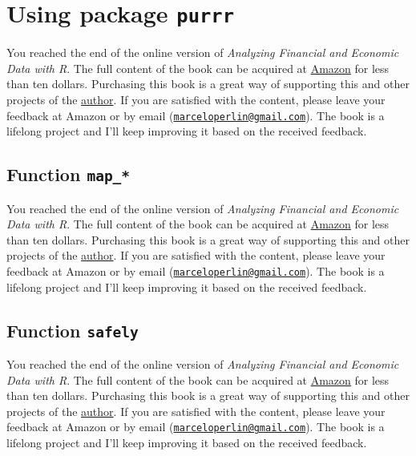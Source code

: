 \documentclass[
  12pt,
]{book}
\newenvironment{pleasebuyit}
{\begin{noteblock}
		
	} {\end{noteblock}}
\begin{document}
\hypertarget{using-package-purrr}{%
\section{\texorpdfstring{Using package \texttt{purrr}}{Using package purrr}}\label{using-package-purrr}}

\begin{pleasebuyit}
You reached the end of the online version of \emph{Analyzing Financial
and Economic Data with R}. The full content of the book can be acquired
at \href{https://www.amazon.com/dp/B084LSNXMN}{Amazon} for less than ten
dollars. Purchasing this book is a great way of supporting this and
other projects of the \href{https://www.msperlin.com/blog/}{author}. If
you are satisfied with the content, please leave your feedback at Amazon
or by email
(\href{mailto:marceloperlin@gmail.com}{\nolinkurl{marceloperlin@gmail.com}}).
The book is a lifelong project and I'll keep improving it based on the
received feedback.
\end{pleasebuyit}

\hypertarget{function-map_}{%
\subsection{\texorpdfstring{Function \texttt{map\_*}}{Function map\_*}}\label{function-map_}}

\begin{pleasebuyit}
You reached the end of the online version of \emph{Analyzing Financial
and Economic Data with R}. The full content of the book can be acquired
at \href{https://www.amazon.com/dp/B084LSNXMN}{Amazon} for less than ten
dollars. Purchasing this book is a great way of supporting this and
other projects of the \href{https://www.msperlin.com/blog/}{author}. If
you are satisfied with the content, please leave your feedback at Amazon
or by email
(\href{mailto:marceloperlin@gmail.com}{\nolinkurl{marceloperlin@gmail.com}}).
The book is a lifelong project and I'll keep improving it based on the
received feedback.
\end{pleasebuyit}

\hypertarget{function-safely}{%
\subsection{\texorpdfstring{Function \texttt{safely}}{Function safely}}\label{function-safely}}

\begin{pleasebuyit}
You reached the end of the online version of \emph{Analyzing Financial
and Economic Data with R}. The full content of the book can be acquired
at \href{https://www.amazon.com/dp/B084LSNXMN}{Amazon} for less than ten
dollars. Purchasing this book is a great way of supporting this and
other projects of the \href{https://www.msperlin.com/blog/}{author}. If
you are satisfied with the content, please leave your feedback at Amazon
or by email
(\href{mailto:marceloperlin@gmail.com}{\nolinkurl{marceloperlin@gmail.com}}).
The book is a lifelong project and I'll keep improving it based on the
received feedback.
\end{pleasebuyit}
\end{document}
